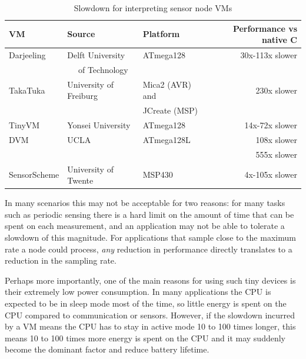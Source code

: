 \begin{table}
\caption{Slowdown for interpreting sensor node VMs}
\label{tbl-slowdown-for-sensornode-vms}
    \begin{tabular}{lllr} %
    \toprule
    VM              & Source                           & Platform                   & Performance vs native C \\
    \midrule
    \midrule
    Darjeeling      & Delft University                 & ATmega128                  & 30x-113x slower \cite{Brouwers:2009cj} \\
                    & ~~ of Technology                 &                            & \\
    TakaTuka        & University of Freiburg           & Mica2 (AVR) and            & 230x slower \cite{Ellul:2012thesis} \\
                    &                                  & JCreate (MSP)              & \\
    TinyVM          & Yonsei University                & ATmega128                  & 14x-72x slower \cite{Hong:2012wj} \\
    DVM             & UCLA                             & ATmega128L                 & 108x slower \cite{Balani:2006} \\
                    &                                  &                            & 555x slower \cite{Kumar:2007ge} \\
    SensorScheme    & University of Twente             & MSP430                     & 4x-105x slower \cite{Evers:2010ur} \\
    \bottomrule
    \end{tabular}
\end{table}

In many scenarios this may not be acceptable for two reasons: for many tasks such as periodic sensing there is a hard limit on the amount of time that can be spent on each measurement, and an application may not be able to tolerate a slowdown of this magnitude. For applications that sample close to the maximum rate a node could process, \emph{any} reduction in performance directly translates to a reduction in the sampling rate.

Perhaps more importantly, one of the main reasons for using such tiny devices is their extremely low power consumption. In many applications the CPU is expected to be in sleep mode most of the time, so little energy is spent on the CPU compared to communication or sensors. However, if the slowdown incurred by a VM means the CPU has to stay in active mode 10 to 100 times longer, this means 10 to 100 times more energy is spent on the CPU and it may suddenly become the dominant factor and reduce battery lifetime.

